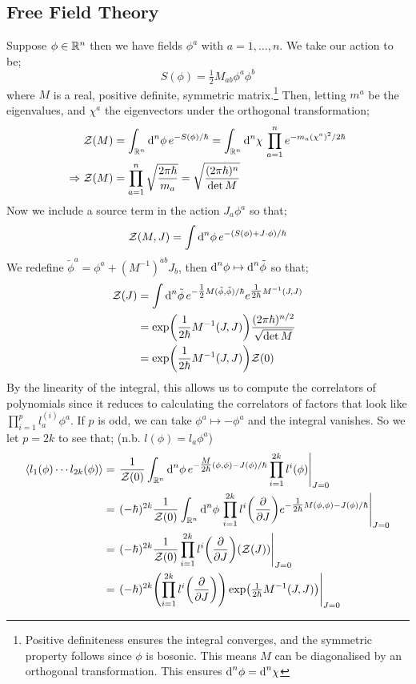 \subsection{Free Field Theory}
Suppose $\phi \in \mathbb{R}^n$ then we have fields $\phi^a$ with $a = 1, \ldots, n$. We take our action to be;
\begin{equation}
S(\phi) = \tfrac{1}{2}M_{ab}\phi^a \phi^b
\end{equation}
where $M$ is a real, positive definite, symmetric matrix.\footnote{Positive definiteness ensures the integral converges, and the symmetric property follows since $\phi$ is bosonic. This means $M$ can be diagonalised by an orthogonal transformation. This ensures $\text{d}^n \phi = \text{d}^n \chi$} Then, letting $m^a$ be the eigenvalues, and $\chi^a$ the eigenvectors under the orthogonal transformation;
\begin{align}
\mathcal{Z}(M) &= \int_{\mathbb{R}^n}{\text{d}^n \phi \,e^{-S(\phi)/\hbar}} = \int_{\mathbb{R}^n}{\text{d}^n \chi \,\prod_{a = 1}^{n}e^{-m_a (\chi^a)^2/2\hbar}} \nonumber \\
\Rightarrow \mathcal{Z}(M) &= \prod_{a = 1}^n{\sqrt{\frac{2\pi \hbar}{m_a}}} = \sqrt{\frac{(2\pi \hbar)^n}{\det M}}
\end{align}
Now we include a source term in the action $J_a \phi^a$ so that;
\begin{equation*}
\mZ(M, J) = \int{\upd{^n\phi}e^{-\left(S(\phi) + J\cdot \phi\right)/\hbar}}
\end{equation*}
We redefine $\tilde{\phi}^a = \phi^a + (M^{-1})^{ab} J_b$, then $\text{d}^n \phi \mapsto \text{d}^n \tilde{\phi}$ so that;
\begin{align*}
\mZ(J) &= \int{\upd{^n\tilde{\phi}}e^{-\tfrac{1}{2}M(\tilde{\phi}, \tilde{\phi})/\hbar}e^{\tfrac{1}{2\hbar}M^{-1}(J, J)}} \\
&= \exp\left(\frac{1}{2\hbar}M^{-1}(J, J)\right) \frac{(2\pi\hbar)^{n/2}}{\sqrt{\det M}} \\
&= \exp\left(\frac{1}{2\hbar}M^{-1}(J, J)\right)\mZ(0)
\end{align*}
By the linearity of the integral, this allows us to compute the correlators of polynomials since it reduces to calculating the correlators of factors that look like $\prod_{i = 1}^{p}{l_a^{(i)}\phi^a}$. If $p$ is odd, we can take $\phi^a \mapsto -\phi^a$ and the integral vanishes. So we let $p = 2k$ to see that; (n.b. $l(\phi) = l_a \phi^a$)
\begin{align*}
\left< l_1(\phi)\cdots l_{2k}(\phi) \right> &= \left.\frac{1}{\mZ(0)}\int_{\RR^n}{\upd{^n \phi}e^{-\tfrac{M}{2\hbar}(\phi, \phi) - J(\phi)/\hbar}\prod_{i = 1}^{2k}{l^i(\phi)}}\right|_{J = 0} \\
&= \left.(-\hbar)^{2k}\frac{1}{\mZ(0)}\int_{\RR^n}{\upd{^n \phi}\prod_{i = 1}^{2k}{l^i\left(\frac{\del}{\del J}\right) e^{-\tfrac{1}{2\hbar}M(\phi, \phi)-J(\phi)/\hbar}}}\right|_{J = 0} \\
&= \left.(-\hbar)^{2k}\frac{1}{\mZ(0)}\prod_{i = 1}^{2k}{l^i\left(\frac{\del}{\del J}\right)} \left(\mZ(J)\right)\right|_{J = 0} \\
&= \left.(-\hbar)^{2k}\left(\prod_{i = 1}^{2k}{l^i\left(\frac{\del}{\del J}\right)}\right)\exp\left(\tfrac{1}{2\hbar}M^{-1}(J, J)\right)\right|_{J = 0}
\end{align*}

